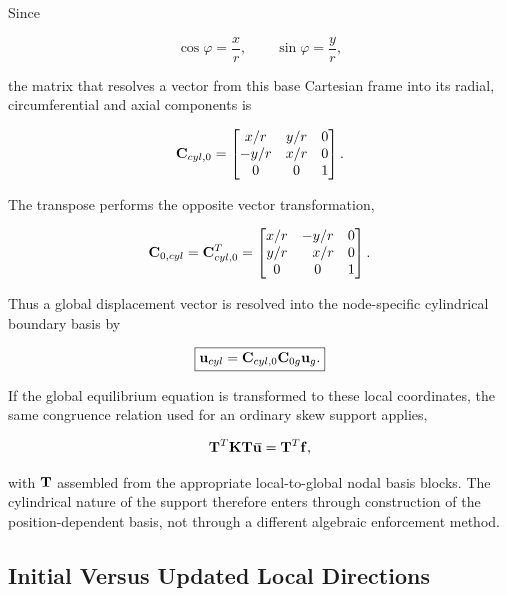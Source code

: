 Since

\begin{equation}
    \cos\varphi=\frac{x}{r},
    \qquad
    \sin\varphi=\frac{y}{r},
\end{equation}

the matrix that resolves a vector from this base Cartesian frame into its
radial, circumferential and axial components is

\begin{equation}
    \mathbf{C}_{cyl,0}
    =
    \begin{bmatrix}
        x/r&y/r&0\\
        -y/r&x/r&0\\
        0&0&1
    \end{bmatrix}.
\end{equation}

The transpose performs the opposite vector transformation,

\begin{equation}
    \mathbf{C}_{0,cyl}
    =
    \mathbf{C}_{cyl,0}^T
    =
    \begin{bmatrix}
        x/r&-y/r&0\\
        y/r&\phantom{-}x/r&0\\
        0&0&1
    \end{bmatrix}.
\end{equation}

Thus a global displacement vector is resolved into the node-specific
cylindrical boundary basis by

\begin{equation}
    \boxed{
    \mathbf{u}_{cyl}
    =\mathbf{C}_{cyl,0}\mathbf{C}_{0g}\mathbf{u}_g.}
\end{equation}

If the global equilibrium equation is transformed to these local coordinates,
the same congruence relation used for an ordinary skew support applies,

\begin{equation}
    \mathbf{T}^T\mathbf{K}\mathbf{T}{}\mkern3mu\overline{\mkern-3mu\mathbf{u}}
    =\mathbf{T}^T\mathbf{f},
\end{equation}

with $\mathbf{T}$ assembled from the appropriate local-to-global nodal basis blocks.
The cylindrical nature of the support therefore enters through construction of
the position-dependent basis, not through a different algebraic enforcement
method.

\subsection{Initial Versus Updated Local Directions}

